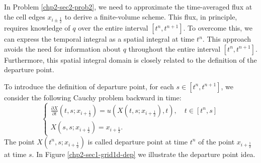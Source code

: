In Problem \ref{chp2-sec2-prob2}, we need to approximate the time-averaged flux at the cell edges $x_{i\pm\frac{1}{2}}$
to derive a finite-volume scheme. This flux, in principle, requires knowledge of $q$ over the entire interval $[t^n, t^{n+1}]$. 
To overcome this, we can express the temporal integral as a spatial integral at time $t^n$. 
This approach avoids the need for information about $q$ throughout the entire interval $[t^n, t^{n+1}]$. 
Furthermore, this spatial integral domain is closely related to the definition of the 
departure point. 

To introduce the definition of departure point, for each $s \in [t^n,t^{n+1}]$,
we consider the following Cauchy problem backward in time:
\begin{equation}
	\label{chp-sec-flux:analysis-eq3}
	\begin{cases}
		\frac{\partial X}{\partial t} (t,s;x_{i+\frac{1}{2}}) = u(X(t,s;x_{i+\frac{1}{2}}) ,t),\quad t\in[t^{n},s] \\
		X(s,s;x_{i+\frac{1}{2}}) = x_{i+\frac{1}{2}}.
	\end{cases}
\end{equation}
The point $X(t^n,s;x_{i+\frac{1}{2}})$ is called departure point at time $t^n$
of the point $x_{i+\frac{1}{2}}$ at time $s$.
In Figure \ref{chp2-sec1-grid1d-dep} we illustrate the departure point idea.

